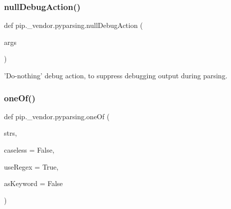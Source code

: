 \subsubsection{\texorpdfstring{null\+Debug\+Action()}{nullDebugAction()}}
{\footnotesize\ttfamily def pip.\+\_\+vendor.\+pyparsing.\+null\+Debug\+Action (\begin{DoxyParamCaption}\item[{}]{args }\end{DoxyParamCaption})}

\begin{DoxyVerb}'Do-nothing' debug action, to suppress debugging output during parsing.\end{DoxyVerb}
 \mbox{\label{namespacepip_1_1__vendor_1_1pyparsing_a5f0669a4c9ed43ca389afbffeebec19b}} 
\subsubsection{\texorpdfstring{one\+Of()}{oneOf()}}
{\footnotesize\ttfamily def pip.\+\_\+vendor.\+pyparsing.\+one\+Of (\begin{DoxyParamCaption}\item[{}]{strs,  }\item[{}]{caseless = {\ttfamily False},  }\item[{}]{use\+Regex = {\ttfamily True},  }\item[{}]{as\+Keyword = {\ttfamily False} }\end{DoxyParamCaption})}

